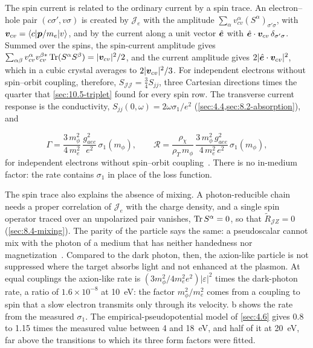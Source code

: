 The spin current is related to the ordinary current by a spin trace. An electron--hole pair $(c\sigma', v\sigma)$ is created by $\mathcal{J}_e$ with the amplitude $\sum_\alpha v^\alpha_{cv}(S^\alpha)_{\sigma'\sigma}$, with $\bm{v}_{cv} = \langle c|\bm{p}/m_e|v\rangle$, and by the current along a unit vector $\hat{\bm{e}}$ with $\hat{\bm{e}}\cdot\bm{v}_{cv}\,\delta_{\sigma'\sigma}$. Summed over the spins, the spin-current amplitude gives $\sum_{\alpha\beta}v^\alpha_{cv}v^{\beta*}_{cv}\operatorname{Tr}(S^\alpha S^\beta) = |\bm{v}_{cv}|^2/2$, and the current amplitude gives $2|\hat{\bm{e}}\cdot\bm{v}_{cv}|^2$, which in a cubic crystal averages to $2|\bm{v}_{cv}|^2/3$. For independent electrons without spin--orbit coupling, therefore, $S_{\mathcal{J}\mathcal{J}} = \frac34 S_{jj}$, three Cartesian directions times the quarter that \cref{sec:10.5-triplet} found for every spin row. The transverse current response is the conductivity, $S_{jj}(0,\omega) = 2\omega\sigma_1/e^2$ (\cref{sec:4.4,sec:8.2-absorption}), and
\begin{keyresult}
\begin{equation}
  \varGamma = \frac{3\,m_\phi^2}{4\,m_e^2}\,\frac{g_{aee}^2}{e^2}\,\sigma_1(m_\phi) , \qquad
  \mathcal{R} = \frac{\rho_\chi}{\rho_T\,m_\phi}\,\frac{3\,m_\phi^2\,g_{aee}^2}{4\,m_e^2\,e^2}\,\sigma_1(m_\phi) ,
  \label{eq:10.7-alp}
\end{equation}
for independent electrons without spin--orbit coupling~\cites[Eq.~(10)]{hochberg2017absorption}[Eq.~(47)]{mitridate2021dark}. There is no in-medium factor: the rate contains $\sigma_1$ in place of the loss function.
\end{keyresult}
\noindent The spin trace also explains the absence of mixing. A photon-reducible chain needs a proper correlation of $\mathcal{J}_e$ with the charge density, and a single spin operator traced over an unpolarized pair vanishes, $\operatorname{Tr} S^\alpha = 0$, so that $\tilde R_{\mathcal{J}Z} = 0$ (\cref{sec:8.4-mixing}). The parity of the particle says the same: a pseudoscalar cannot mix with the photon of a medium that has neither handedness nor magnetization~\cite[Sect.~III\,B, footnote~5]{mitridate2021dark}. Compared to the dark photon, then, the axion-like particle is not suppressed where the target absorbs light and not enhanced at the plasmon. At equal couplings the axion-like rate is $(3m_\phi^2/4m_e^2e^2)|\varepsilon|^2$ times the dark-photon rate, a ratio of $1.6\times10^{-8}$ at \SI{10}{eV}: the factor $m_\phi^2/m_e^2$ comes from a coupling to spin that a slow electron transmits only through its velocity. b shows the rate from the measured $\sigma_1$. The empirical-pseudopotential model of \cref{sec:4.6} gives 0.8 to 1.15 times the measured value between 4 and \SI{18}{eV}, and half of it at \SI{20}{eV}, far above the transitions to which its three form factors were fitted.

